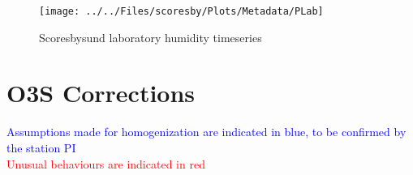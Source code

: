                \begin{figure}
        \centering
\texttt{[image: ../../Files/scoresby/Plots/Metadata/PLab]}
    \caption{Scoresbysund laboratory humidity timeseries}
            \label{fig:PLab}
    \end{figure}

\section{O3S Corrections}
\label{sec:v04}

\textcolor{blue}{Assumptions made for homogenization are indicated in blue, to be confirmed by the station PI}\\
\textcolor{red}{Unusual behaviours are indicated in red}


